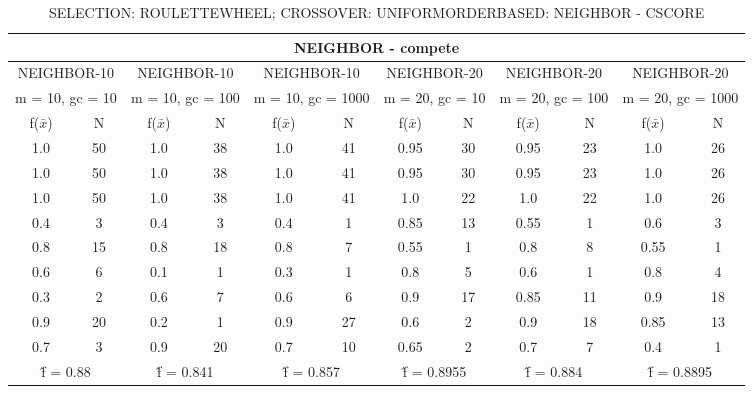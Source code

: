 \begin{table}[H]
	\centering
	\caption{SELECTION: ROULETTEWHEEL; CROSSOVER: UNIFORMORDERBASED: NEIGHBOR - CSCORE}
	\begin{adjustbox}{width=1\textwidth}
		\begin{tabular}{ |c|c||c|c||c|c||c|c||c|c||c|c| }
			\hline
			\multicolumn{12}{|c|}{NEIGHBOR - compete} \\
			\hline
			\multicolumn{2}{|c||}{NEIGHBOR-10} & \multicolumn{2}{c||}{NEIGHBOR-10} & \multicolumn{2}{c||}{NEIGHBOR-10} & \multicolumn{2}{c||}{NEIGHBOR-20} & \multicolumn{2}{c||}{NEIGHBOR-20} & \multicolumn{2}{c|}{NEIGHBOR-20}\\
			\hline
			\multicolumn{2}{|c||}{m = 10, gc = 10} & \multicolumn{2}{c||}{m = 10, gc = 100} & \multicolumn{2}{c||}{m = 10, gc = 1000} & \multicolumn{2}{c||}{m = 20, gc = 10} & \multicolumn{2}{c||}{m = 20, gc = 100} & \multicolumn{2}{c|}{m = 20, gc = 1000}\\
			\hline
			f($\bar{x}$) & N & f($\bar{x}$) & N & f($\bar{x}$) & N & f($\bar{x}$) & N & f($\bar{x}$) & N & f($\bar{x}$) & N\\
			\hline
			\hline
			1.0 & 50 & 1.0 & 38 & 1.0 & 41 & 0.95 & 30 & 0.95 & 23 & 1.0 & 26\\
			\hline
			1.0 & 50 & 1.0 & 38 & 1.0 & 41 & 0.95 & 30 & 0.95 & 23 & 1.0 & 26\\
			1.0 & 50 & 1.0 & 38 & 1.0 & 41 & 1.0 & 22 & 1.0 & 22 & 1.0 & 26\\
			0.4 & 3 & 0.4 & 3 & 0.4 & 1 & 0.85 & 13 & 0.55 & 1 & 0.6 & 3\\
			0.8 & 15 & 0.8 & 18 & 0.8 & 7 & 0.55 & 1 & 0.8 & 8 & 0.55 & 1\\
			0.6 & 6 & 0.1 & 1 & 0.3 & 1 & 0.8 & 5 & 0.6 & 1 & 0.8 & 4\\
			0.3 & 2 & 0.6 & 7 & 0.6 & 6 & 0.9 & 17 & 0.85 & 11 & 0.9 & 18\\
			0.9 & 20 & 0.2 & 1 & 0.9 & 27 & 0.6 & 2 & 0.9 & 18 & 0.85 & 13\\
			0.7 & 3 & 0.9 & 20 & 0.7 & 10 & 0.65 & 2 & 0.7 & 7 & 0.4 & 1\\
			\hline
			\multicolumn{2}{|c||}{\^{f} = 0.88} & \multicolumn{2}{c||}{\^{f} = 0.841} & \multicolumn{2}{c||}{\^{f} = 0.857} & \multicolumn{2}{c||}{\^{f} = 0.8955} & \multicolumn{2}{c||}{\^{f} = 0.884} & \multicolumn{2}{c|}{\^{f} = 0.8895}\\
			\hline
		\end{tabular}
	\end{adjustbox}
\end{table}

